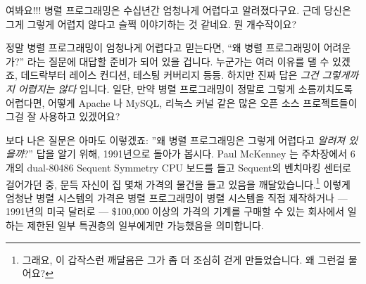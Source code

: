 \QuickQ{}
	여봐요!!!
	병렬 프로그래밍은 수십년간 엄청나게 어렵다고 알려졌다구요.
	근데 당신은 그게 그렇게 어렵지 않다고 슬쩍 이야기하는 것 같네요.
	뭔 개수작이요?

\QuickA{}
	정말 병렬 프로그래밍이 엄청나게 어렵다고 믿는다면, ``왜 병렬
	프로그래밍이 어려운가?'' 라는 질문에 대답할 준비가 되어 있을 겁니다.
	누군가는 여러 이유를 댈 수 있겠죠, 데드락부터 레이스 컨디션, 테스팅
	커버리지 등등. 하지만 진짜 답은 {\em 그건 그렇게까지 어렵지는 않다}
	입니다.
	일단, 만약 병렬 프로그래밍이 정말로 그렇게 소름끼치도록 어렵다면,
	어떻게 Apache 나 MySQL, 리눅스 커널 같은 많은 오픈 소스 프로젝트들이
	그걸 잘 사용하고 있겠어요?

	보다 나은 질문은 아마도 이렇겠죠: ''왜 병렬 프로그래밍은 그렇게
	어렵다고 {\em 알려져 있을까}?''
	답을 알기 위해, 1991년으로 돌아가 봅시다.
	Paul McKenney 는 주차장에서 6개의 dual-80486 Sequent Symmetry CPU
	보드를 들고 Sequent의 벤치마킹 센터로 걸어가던 중, 문득 자신이 집 몇채
	가격의 물건을 들고 있음을 깨달았습니다.\footnote{
	그래요, 이 갑작스런 깨달음은 그가 좀 더 조심히 걷게 만들었습니다. 왜
	그런걸 물어요?}
	이렇게 엄청난 병렬 시스템의 가격은 병렬 프로그래밍이 병렬 시스템을 직접
	제작하거나 --- 1991년의 미국 달러로 --- \$100,000 이상의 가격의 기계를
	구매할 수 있는 회사에서 일하는 제한된 일부 특권층의 일부에게만
	가능했음을 의미합니다.


